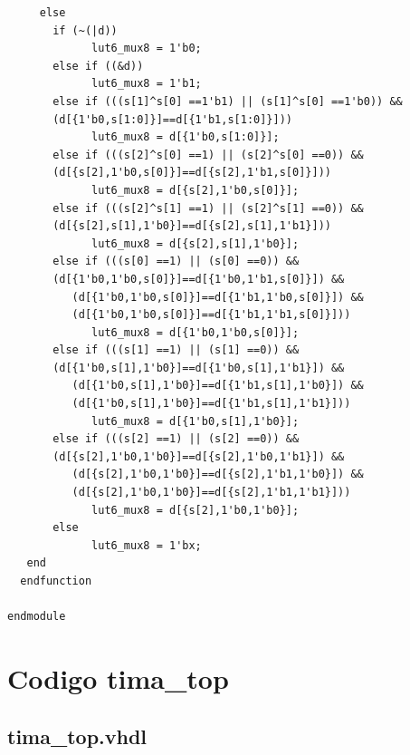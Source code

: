 \documentclass[a4paper,openright,12pt]{report}
\begin{document}
\begin{lstlisting}
     else
       if (~(|d))
             lut6_mux8 = 1'b0;
       else if ((&d))
             lut6_mux8 = 1'b1;
       else if (((s[1]^s[0] ==1'b1) || (s[1]^s[0] ==1'b0)) &&
       (d[{1'b0,s[1:0]}]==d[{1'b1,s[1:0]}]))
             lut6_mux8 = d[{1'b0,s[1:0]}];
       else if (((s[2]^s[0] ==1) || (s[2]^s[0] ==0)) &&
       (d[{s[2],1'b0,s[0]}]==d[{s[2],1'b1,s[0]}]))
             lut6_mux8 = d[{s[2],1'b0,s[0]}];
       else if (((s[2]^s[1] ==1) || (s[2]^s[1] ==0)) && 
       (d[{s[2],s[1],1'b0}]==d[{s[2],s[1],1'b1}]))
             lut6_mux8 = d[{s[2],s[1],1'b0}];
       else if (((s[0] ==1) || (s[0] ==0)) && 
       (d[{1'b0,1'b0,s[0]}]==d[{1'b0,1'b1,s[0]}]) &&
          (d[{1'b0,1'b0,s[0]}]==d[{1'b1,1'b0,s[0]}]) && 
          (d[{1'b0,1'b0,s[0]}]==d[{1'b1,1'b1,s[0]}]))
             lut6_mux8 = d[{1'b0,1'b0,s[0]}];
       else if (((s[1] ==1) || (s[1] ==0)) && 
       (d[{1'b0,s[1],1'b0}]==d[{1'b0,s[1],1'b1}]) &&
          (d[{1'b0,s[1],1'b0}]==d[{1'b1,s[1],1'b0}]) &&
          (d[{1'b0,s[1],1'b0}]==d[{1'b1,s[1],1'b1}]))
             lut6_mux8 = d[{1'b0,s[1],1'b0}];
       else if (((s[2] ==1) || (s[2] ==0)) && 
       (d[{s[2],1'b0,1'b0}]==d[{s[2],1'b0,1'b1}]) &&
          (d[{s[2],1'b0,1'b0}]==d[{s[2],1'b1,1'b0}]) && 
          (d[{s[2],1'b0,1'b0}]==d[{s[2],1'b1,1'b1}]))
             lut6_mux8 = d[{s[2],1'b0,1'b0}];
       else
             lut6_mux8 = 1'bx;
   end
  endfunction

endmodule
\end{lstlisting}







\chapter{Codigo tima\_top}\label{aped.B}

\section{tima\_top.vhdl}
    
\end{document}
